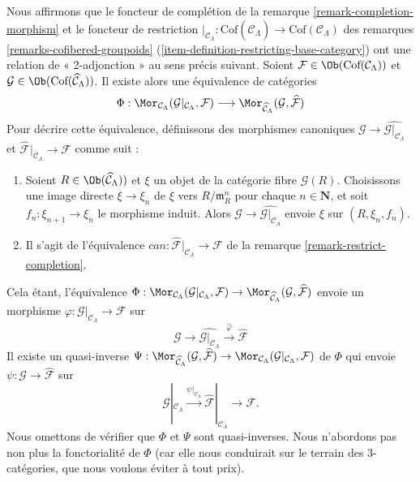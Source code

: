 \begin{remark}
\label{remark-completion-restriction-adjoint}
Nous affirmons que le foncteur de complétion de la remarque
\ref{remark-completion-morphism} et le foncteur de restriction
$|_{\mathcal{C}_\Lambda} : \text{Cof}(\widehat{\mathcal{C}}_\Lambda)
\to \text{Cof}(\mathcal{C}_\Lambda)$ des remarques
\ref{remarks-cofibered-groupoids}
(\ref{item-definition-restricting-base-category})
ont une relation de « 2-adjonction » au sens précis suivant. Soient
$\mathcal{F} \in \Ob(\text{Cof}(\mathcal{C}_\Lambda))$ et
$\mathcal{G} \in \Ob(\text{Cof}(\widehat{\mathcal{C}}_\Lambda))$.
Il existe alors une équivalence de catégories
$$
\Phi :
\Mor_{\mathcal{C}_\Lambda}(
\mathcal{G}|_{\mathcal{C}_\Lambda}, \mathcal{F})
\longrightarrow
\Mor_{\widehat{\mathcal{C}}_\Lambda}(\mathcal{G}, \widehat{\mathcal{F}})
$$
Pour décrire cette équivalence, définissons des morphismes canoniques
$\mathcal{G} \to \widehat{\mathcal{G}|_{\mathcal{C}_\Lambda}}$ et
$\widehat{\mathcal{F}}|_{\mathcal{C}_\Lambda} \to \mathcal{F}$ comme suit :
\begin{enumerate}
\item Soient $R \in \Ob(\widehat{\mathcal{C}}_\Lambda))$ et $\xi$ un objet
de la catégorie fibre $\mathcal{G}(R)$. Choisissons une image directe
$\xi \to \xi_n$ de $\xi$ vers $R/\mathfrak m_R^n$ pour chaque
$n \in \mathbf{N}$, et soit $f_n : \xi_{n + 1} \to \xi_n$ le morphisme
induit. Alors $\mathcal{G} \to \widehat{\mathcal{G}|_{\mathcal{C}_\Lambda}}$
envoie $\xi$ sur
$(R, \xi_n, f_n)$.
\item Il s'agit de l'équivalence
$can : \widehat{\mathcal{F}}|_{\mathcal{C}_\Lambda} \to \mathcal{F}$
de la remarque \ref{remark-restrict-completion}.
\end{enumerate}
Cela étant, l'équivalence
$\Phi : \Mor_{\mathcal{C}_\Lambda}(
\mathcal{G}|_{\mathcal{C}_\Lambda}, \mathcal{F})  \to
\Mor_{\widehat{\mathcal{C}}_\Lambda}(\mathcal{G},
\widehat{\mathcal{F}})$
envoie un morphisme
$\varphi : \mathcal{G}|_{\mathcal{C}_\Lambda} \to \mathcal{F}$
sur
$$
\mathcal{G} \to \widehat{\mathcal{G}|_{\mathcal{C}_\Lambda}}
\xrightarrow{\widehat{\varphi}} \widehat{\mathcal{F}}
$$
Il existe un quasi-inverse
$\Psi :
\Mor_{\widehat{\mathcal{C}}_\Lambda}(
\mathcal{G}, \widehat{\mathcal{F}}) \to
\Mor_{\mathcal{C}_\Lambda}(
\mathcal{G}|_{\mathcal{C}_\Lambda}, \mathcal{F})$
de $\Phi$ qui envoie $\psi : \mathcal{G} \to \widehat{\mathcal{F}}$ sur
$$
\mathcal{G}|_{\mathcal{C}_\Lambda} \xrightarrow{\psi|_{\mathcal{C}_\Lambda}}
\widehat{\mathcal{F}}|_{\mathcal{C}_\Lambda} \to \mathcal{F}.
$$
Nous omettons de vérifier que $\Phi$ et $\Psi$ sont quasi-inverses. Nous
n'abordons pas non plus la fonctorialité de $\Phi$ (car elle nous conduirait
sur le terrain des 3-catégories, que nous voulons éviter à tout prix).
\end{remark}

